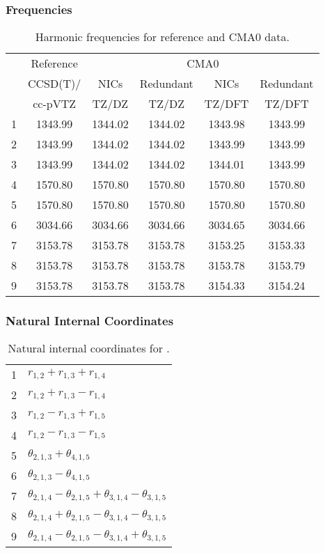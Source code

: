 \documentclass[10pt,oneside]{article}
\begin{document}
\begin{table}[h!]
\subsubsection*{Frequencies}
\centering
\caption{Harmonic frequencies for reference and CMA0 data.}
\begin{tabular}{cccccc}
\toprule
{} & Reference & \multicolumn{4}{c}{CMA0} \\
{} &  CCSD(T)/ &    NICs &  Redundant &    NICs & Redundant \\
{} &   cc-pVTZ &   TZ/DZ &      TZ/DZ &  TZ/DFT &    TZ/DFT \\
\midrule
1 &   1343.99 & 1344.02 &    1344.02 & 1343.98 &   1343.99 \\
2 &   1343.99 & 1344.02 &    1344.02 & 1343.99 &   1343.99 \\
3 &   1343.99 & 1344.02 &    1344.02 & 1344.01 &   1343.99 \\
4 &   1570.80 & 1570.80 &    1570.80 & 1570.80 &   1570.80 \\
5 &   1570.80 & 1570.80 &    1570.80 & 1570.80 &   1570.80 \\
6 &   3034.66 & 3034.66 &    3034.66 & 3034.65 &   3034.66 \\
7 &   3153.78 & 3153.78 &    3153.78 & 3153.25 &   3153.33 \\
8 &   3153.78 & 3153.78 &    3153.78 & 3153.78 &   3153.79 \\
9 &   3153.78 & 3153.78 &    3153.78 & 3154.33 &   3154.24 \\
\bottomrule
\end{tabular}
\end{table}

\begin{table}[h!]
\subsubsection*{Natural Internal Coordinates}
\centering
\caption{Natural internal coordinates for .}
\small
\begin{tabular}{ll}
\toprule
  1   & $r_{1,2} + r_{1,3} + r_{1,4}$ \\
  2   & $r_{1,2} + r_{1,3} - r_{1,4}$ \\
  3   & $r_{1,2} - r_{1,3} + r_{1,5}$ \\
  4   & $r_{1,2} - r_{1,3} - r_{1,5}$ \\
  5   & $\theta_{2,1,3} + \theta_{4,1,5}$ \\
  6   & $\theta_{2,1,3} - \theta_{4,1,5}$ \\
  7   & $\theta_{2,1,4} - \theta_{2,1,5} + \theta_{3,1,4} - \theta_{3,1,5}$ \\
  8   & $\theta_{2,1,4} + \theta_{2,1,5} - \theta_{3,1,4} - \theta_{3,1,5}$ \\
  9   & $\theta_{2,1,4} - \theta_{2,1,5} - \theta_{3,1,4} + \theta_{3,1,5}$ \\
\bottomrule
\end{tabular}
\end{table}
\end{document}
